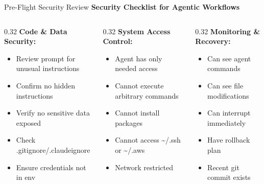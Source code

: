 \documentclass[aspectratio=169,11pt]{beamer}
\begin{document}
\begin{frame}{Pre-Flight Security Review}
    \textbf{Security Checklist for Agentic Workflows}

    \begin{columns}[T]
        \begin{column}{0.32\textwidth}
            \textbf{Code \& Data Security:}
            \begin{itemize}
                \item[$\square$] Review prompt for unusual instructions
                \item[$\square$] Confirm no hidden instructions
                \item[$\square$] Verify no sensitive data exposed
                \item[$\square$] Check .gitignore/.claudeignore
                \item[$\square$] Ensure credentials not in env
            \end{itemize}
        \end{column}
        \begin{column}{0.32\textwidth}
            \textbf{System Access Control:}
            \begin{itemize}
                \item[$\square$] Agent has only needed access
                \item[$\square$] Cannot execute arbitrary commands
                \item[$\square$] Cannot install packages
                \item[$\square$] Cannot access \~{}/.ssh or \~{}/.aws
                \item[$\square$] Network restricted
            \end{itemize}
        \end{column}
        \begin{column}{0.32\textwidth}
            \textbf{Monitoring \& Recovery:}
            \begin{itemize}
                \item[$\square$] Can see agent commands
                \item[$\square$] Can see file modifications
                \item[$\square$] Can interrupt immediately
                \item[$\square$] Have rollback plan
                \item[$\square$] Recent git commit exists
            \end{itemize}
        \end{column}
    \end{columns}


\end{frame}
\end{document}
